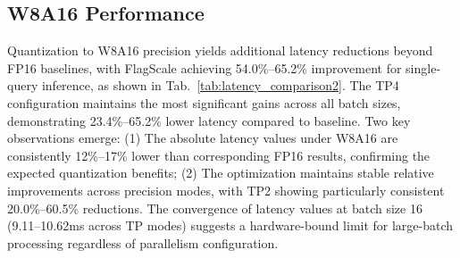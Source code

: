 \begin{table}[h]
\centering
\caption{FP16 Latency Comparison (85-token generation, ms)}
\label{tab:latency_comparison1}
\end{table}

\subsection{W8A16 Performance}
Quantization to W8A16 precision yields additional latency reductions beyond FP16 baselines, with FlagScale achieving 54.0\%–65.2\% improvement for single-query inference, as shown in Tab.~\ref{tab:latency_comparison2}. The TP4 configuration maintains the most significant gains across all batch sizes, demonstrating 23.4\%–65.2\% lower latency compared to baseline. Two key observations emerge: (1) The absolute latency values under W8A16 are consistently 12\%–17\% lower than corresponding FP16 results, confirming the expected quantization benefits; (2) The optimization maintains stable relative improvements across precision modes, with TP2 showing particularly consistent 20.0\%–60.5\% reductions. The convergence of latency values at batch size 16 (9.11–10.62ms across TP modes) suggests a hardware-bound limit for large-batch processing regardless of parallelism configuration.

